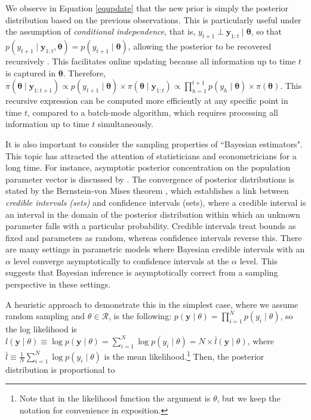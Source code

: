We observe in Equation \ref{equpdate} that the new prior is simply the posterior distribution based on the previous observations. This is particularly useful under the assumption of \textit{conditional independence}, that is, $y_{t+1} \perp \mathbf{y}_{1:t} \mid \bm{\theta}$, so that $p(y_{t+1} \mid \mathbf{y}_{1:t}, \bm{\theta}) = p(y_{t+1} \mid \bm{\theta})$, allowing the posterior to be recovered recursively \cite{petris2009dynamic}. This facilitates online updating because all information up to time $t$ is captured in $\bm{\theta}$. Therefore, $\pi(\bm{\theta} \mid \mathbf{y}_{1:t+1}) \propto p(y_{t+1} \mid \bm{\theta}) \times \pi(\bm{\theta} \mid \mathbf{y}_{1:t}) \propto \prod_{h=1}^{t+1} p(y_h \mid \bm{\theta}) \times \pi(\bm{\theta})$. This recursive expression can be computed more efficiently at any specific point in time $t$, compared to a batch-mode algorithm, which requires processing all information up to time $t$ simultaneously.

It is also important to consider the sampling properties of ``Bayesian estimators". This topic has attracted the attention of statisticians and econometricians for a long time. For instance, asymptotic posterior concentration on the population parameter vector is discussed by \cite{bickel1969some}. The convergence of posterior distributions is stated by the Bernstein-von Mises theorem \cite{Lehmann2003,van2000asymptotic}, which establishes a link between \textit{credible intervals (sets)} and confidence intervals (sets), where a credible interval is an interval in the domain of the posterior distribution within which an unknown parameter falls with a particular probability. Credible intervals treat bounds as fixed and parameters as random, whereas confidence intervals reverse this. There are many settings in parametric models where Bayesian credible intervals with an $\alpha$ level converge asymptotically to confidence intervals at the $\alpha$ level. This suggests that Bayesian inference is asymptotically correct from a sampling perspective in these settings.

A heuristic approach to demonstrate this in the simplest case, where we assume random sampling and $\theta \in \mathcal{R}$, is the following: $p(\mathbf{y} \mid \theta) = \prod_{i=1}^N p(y_i \mid \theta)$, so the log likelihood is $l(\mathbf{y} \mid \theta) \equiv \log p(\mathbf{y} \mid \theta) = \sum_{i=1}^N \log p(y_i \mid \theta) = N \times \bar{l}(\mathbf{y} \mid \theta)$, where $\bar{l} \equiv \frac{1}{N} \sum_{i=1}^N \log p(y_i \mid \theta)$ is the mean likelihood.\footnote{Note that in the likelihood function the argument is $\theta$, but we keep the notation for convenience in exposition.} Then, the posterior distribution is proportional to

